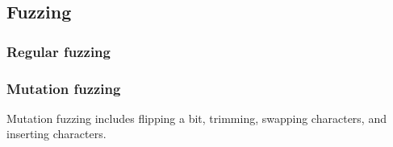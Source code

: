 \documentclass{article}
\begin{document}

\break

\subsection{Fuzzing}
\subsubsection{Regular fuzzing}

\break

\subsubsection{Mutation fuzzing}
Mutation fuzzing includes flipping a bit, trimming, swapping characters, and inserting characters.

\break
\end{document}
